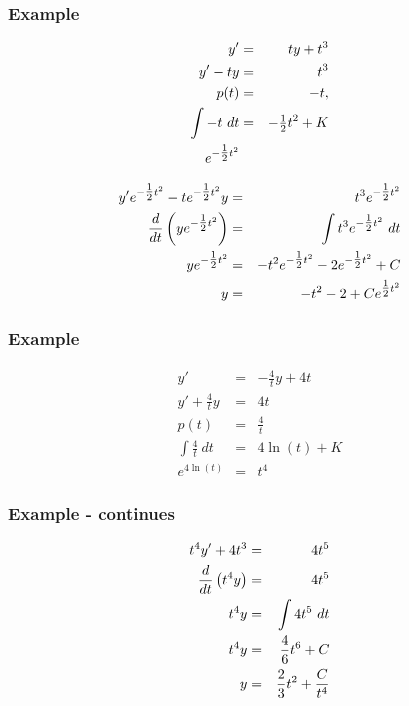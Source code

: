 \begin{frame}
  \frametitle{Example}

  \vspace*{-3em}
  \begin{eqnarray*}
    y' & = & ty + t^3 \\
    y' - ty & = & t^3 \\
    p(t) & = & -t, \\
    \int -t ~ dt & = & -\mbox{$\frac{1}{2}$} t^2 + K \\
    e^{-\mbox{$\frac{1}{2}$} t^2} & & 
  \end{eqnarray*}

  \begin{eqnarray*}
    y' e^{-\mbox{$\frac{1}{2}$} t^2} - t e^{-\mbox{$\frac{1}{2}$} t^2} y & = & t^3 e^{-\mbox{$\frac{1}{2}$} t^2} \\
    \frac{d}{dt} \left( y e^{-\mbox{$\frac{1}{2}$} t^2} \right) & = & \int t^3 e^{-\mbox{$\frac{1}{2}$} t^2} ~ dt \\
    y e^{-\mbox{$\frac{1}{2}$} t^2} & = & -t^2 e^{-\mbox{$\frac{1}{2}$} t^2} - 2 e^{-\mbox{$\frac{1}{2}$} t^2} + C \\
    y & = & -t^2 - 2 + C e^{\mbox{$\frac{1}{2}$} t^2}
  \end{eqnarray*}

\end{frame}



\begin{frame}
  \frametitle{Example}

  \begin{eqnarray*}
    y' & = & -\frac{4}{t} y + 4 t \\
    y' + \frac{4}{t} y & = & 4 t \\
    p(t) & = & \frac{4}{t} \\
    \int \frac{4}{t} ~ dt & = & 4 \ln(t) + K \\
    e^{4 \ln(t) } & = & t^4
  \end{eqnarray*}

\end{frame}

\begin{frame}
  \frametitle{Example - continues}

  \begin{eqnarray*}
    t^4 y' + 4t^3& = & 4 t^5 \\
    \frac{d}{dt} \left( t^4 y \right) & = & 4 t^5 \\
    t^4 y & = & \int 4 t^5 ~ dt \\
    t^4 y & = & \frac{4}{6} t^6 + C \\
    y & = & \frac{2}{3} t^2 + \frac{C}{t^4}
  \end{eqnarray*}

\end{frame}



